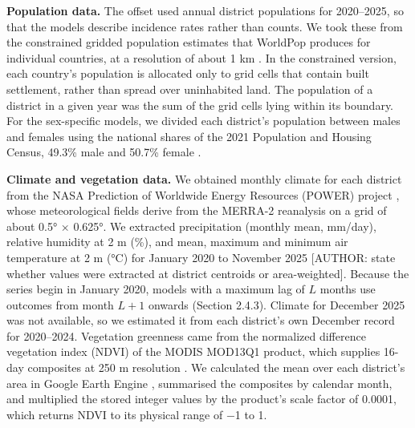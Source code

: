 \documentclass[11pt,a4paper]{article}
\begin{document}
\textbf{Population data.} The offset used annual district populations for 2020--2025, so that the models describe incidence rates rather than counts. We took these from the constrained gridded population estimates that WorldPop produces for individual countries, at a resolution of about 1 km \cite{ref20}. In the constrained version, each country's population is allocated only to grid cells that contain built settlement, rather than spread over uninhabited land. The population of a district in a given year was the sum of the grid cells lying within its boundary. For the sex-specific models, we divided each district's population between males and females using the national shares of the 2021 Population and Housing Census, 49.3\% male and 50.7\% female \cite{ref21}.

\textbf{Climate and vegetation data.} We obtained monthly climate for each district from the NASA Prediction of Worldwide Energy Resources (POWER) project \cite{ref18}, whose meteorological fields derive from the MERRA-2 reanalysis \cite{ref22} on a grid of about 0.5° × 0.625°. We extracted precipitation (monthly mean, mm/day), relative humidity at 2 m (\%), and mean, maximum and minimum air temperature at 2 m (°C) for January 2020 to November 2025 {[}AUTHOR: state whether values were extracted at district centroids or area-weighted{]}. Because the series begin in January 2020, models with a maximum lag of \(L\) months use outcomes from month \(L+1\) onwards (Section 2.4.3). Climate for December 2025 was not available, so we estimated it from each district's own December record for 2020--2024. Vegetation greenness came from the normalized difference vegetation index (NDVI) of the MODIS MOD13Q1 product, which supplies 16-day composites at 250 m resolution \cite{ref23}. We calculated the mean over each district's area in Google Earth Engine \cite{ref24}, summarised the composites by calendar month, and multiplied the stored integer values by the product's scale factor of 0.0001, which returns NDVI to its physical range of −1 to 1.
\end{document}
